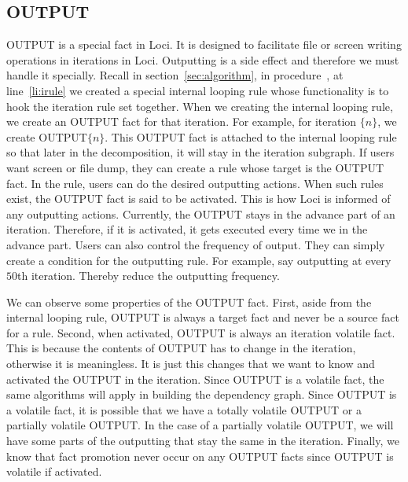 \documentclass{article}
\begin{document}
\subsection{OUTPUT}
OUTPUT is a special fact in Loci. It is designed to facilitate file or
screen writing operations in iterations in Loci. Outputting is a side
effect and therefore we must handle it specially. Recall in
section~\ref{sec:algorithm}, in procedure~, at
line~\ref{li:irule} we created a special internal looping rule whose
functionality is to hook the iteration rule set together. When we
creating the internal looping rule, we create an OUTPUT fact for that
iteration. For example, for iteration $\{n\}$, we create
OUTPUT$\{n\}$. This OUTPUT fact is attached to the internal looping
rule so that later in the decomposition, it will stay in the iteration
subgraph. If users want screen or file dump, they can create a rule
whose target is the OUTPUT fact. In the rule, users can do the desired
outputting actions. When such rules exist, the OUTPUT fact is said to
be activated. This is how Loci is informed of any outputting actions.
Currently, the OUTPUT stays in the advance part of an
iteration. Therefore, if it is activated, it gets executed every
time we in the advance part. Users can also control the frequency of
output. They can simply create a condition for the outputting
rule. For example, say outputting at every $50$th iteration. Thereby
reduce the outputting frequency. 

We can observe some properties of the OUTPUT fact. First, aside from
the internal looping rule, OUTPUT is always a target fact and never be
a source fact for a rule. Second, when activated, OUTPUT is always an
iteration volatile fact. This is because the contents of OUTPUT has to
change in the iteration, otherwise it is meaningless. It is just this
changes that we want to know and activated the OUTPUT in the
iteration. Since OUTPUT is a volatile fact, the same algorithms will
apply in building the dependency graph. Since OUTPUT is a volatile
fact, it is possible that we have a totally volatile OUTPUT or a
partially volatile OUTPUT. In the case of a partially volatile OUTPUT,
we will have some parts of the outputting that stay the same in the
iteration. Finally, we know that fact promotion never occur on any
OUTPUT facts since OUTPUT is volatile if activated. 
\end{document}
